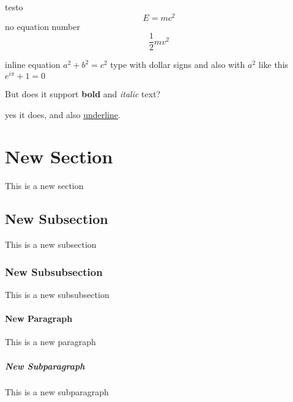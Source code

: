 \documentclass[11pt]{article}
\begin{document}
testo
\begin{equation}
E = mc^2
\end{equation}
no equation number
\[ \frac{1}{2}mv^2\]


inline equation $a^2 + b^2 = c^2$ type with dollar signs
and also with \(a^2\) like this \(e^{i\pi} + 1 = 0\)

But does it support \textbf{bold} and \textit{italic} text?

yes it does, and also \underline{underline}.
\section{New Section} This is a new section
\subsection{New Subsection} This is a new subsection
\subsubsection{New Subsubsection} This is a new subsubsection
\paragraph{New Paragraph} This is a new paragraph

\subparagraph{New Subparagraph} This is a new subparagraph
\end{document}
